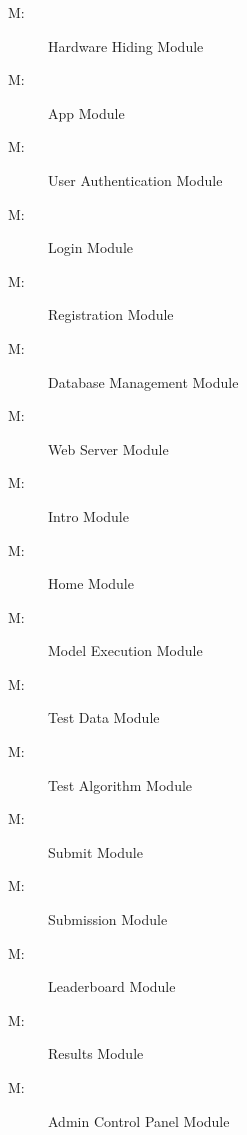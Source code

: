 \documentclass[12pt, titlepage]{article}
\newcounter{mnum}
\newcommand{\mthemnum}{M\themnum}
\begin{document}
\begin{description}
\item [ \mthemnum \label{mHH}:] Hardware Hiding Module
\item [ \mthemnum \label{mA}:] App Module
\item [ \mthemnum \label{mUA}:] User Authentication Module
\item [ \mthemnum \label{mLI}:] Login Module
\item [ \mthemnum \label{mRG}:] Registration Module
\item [ \mthemnum \label{mDM}:] Database Management Module
\item [ \mthemnum \label{mWS}:] Web Server Module
\item [ \mthemnum \label{mI}:] Intro Module
\item [ \mthemnum \label{mH}:] Home Module
\item [ \mthemnum \label{mME}:] Model Execution Module
\item [ \mthemnum \label{mTD}:] Test Data Module
\item [ \mthemnum \label{mTA}:] Test Algorithm Module
\item [ \mthemnum \label{mS}:] Submit Module
\item [ \mthemnum \label{mSN}:] Submission Module
\item [ \mthemnum \label{mL}:] Leaderboard Module
\item [ \mthemnum \label{mR}:] Results Module
\item [ \mthemnum \label{mACP}:] Admin Control Panel Module



\end{description}
\end{document}
